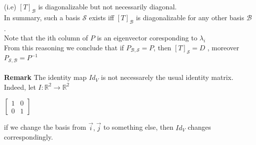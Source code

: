 \documentclass[
12pt,
]{article}
\theoremstyle{definition}
\theoremstyle{definition}
\theoremstyle{definition}
\theoremstyle{definition}
\begin{document}
(i.e) $[T]_\mathcal{B}$ is diagonalizable but not necessarily diagonal.\\
In summary, such a basis $\mathcal{S}$ exists iff $[T]_\mathcal{B}$ is diagonalizable for any other basis $\mathcal{B}$.\\
Note that the ith column of $P$ is an eigenvector coresponding to $ \lambda_i$\\
\qquad From this reasoning we conclude that if $P_{\mathcal{B},\mathcal{S}} = P$, then $[T]_\mathcal{S}=D$ , moreover $P_{\mathcal{S},\mathcal{B}} = P^{-1}$\\ \\
\textbf{Remark} The identity map $Id_V$ is not necessarely the usual identity matrix. Indeed, let $I : \mathbb{R}^2 \xrightarrow{} \mathbb{R}^2 $ 
\begin{center}
    $\begin{bmatrix}
    1 & 0 \\
    0 & 1
    \end{bmatrix}$
\end{center}
if we change the basis from $\vec{i},\vec{j}$ to something else, then $Id_V$ changes correspondingly.\\
\end{document}
